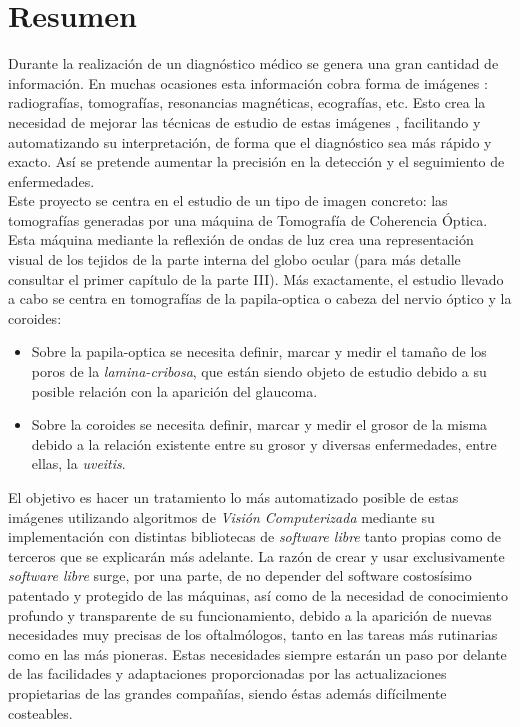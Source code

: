 \section*{Resumen}
Durante la realización de un diagnóstico médico se genera una gran
cantidad de información. En muchas ocasiones esta información cobra
forma de imágenes \emph{\citep*[1. The Analysis of Medical Images,
  2. Digital Image Acquisition]{toennies2012guide}}: radiografías,
tomografías, resonancias magnéticas, ecografías, etc. Esto crea la
necesidad de mejorar las técnicas de estudio de estas imágenes
\emph{\citep*[4. Image Enhancement]{toennies2012guide}}, facilitando y
automatizando su interpretación, de forma que el diagnóstico sea más
rápido y exacto. Así se pretende aumentar la precisión en la detección
y el seguimiento de enfermedades.\\
Este proyecto se centra en el estudio de un tipo de imagen concreto:
las tomografías generadas por una máquina de Tomografía de Coherencia
Óptica. Esta máquina mediante la reflexión de ondas de luz crea una
representación visual de los tejidos de la parte interna del globo
ocular (para más detalle consultar el primer capítulo de la parte
III). Más exactamente, el estudio llevado a cabo se centra en
tomografías de la \gls{papila-optica} o cabeza del nervio óptico y la
\gls{coroides}:
\begin{itemize}
\item Sobre la \gls{papila-optica} se necesita definir, marcar y medir
  el tamaño de los poros de la \emph{\gls{lamina-cribosa}}, que están
  siendo objeto de estudio debido a su posible relación con la
  aparición del \gls{glaucoma}.
\item Sobre la \gls{coroides} se necesita definir, marcar y medir el
  grosor de la misma debido a la relación existente entre su grosor y
  diversas enfermedades, entre ellas, la \emph{\gls{uveitis}}.
\end{itemize}
El objetivo es hacer un tratamiento lo más automatizado posible de
estas imágenes utilizando algoritmos de \emph{Visión Computerizada}
mediante su implementación con distintas bibliotecas de \emph{software
  libre} tanto propias como de terceros que se explicarán más
adelante. La razón de crear y usar exclusivamente \emph{software
  libre} surge, por una parte, de no depender del software costosísimo
patentado y protegido de las máquinas, así como de la necesidad de
conocimiento profundo y transparente de su funcionamiento, debido a la
aparición de nuevas necesidades muy precisas de los oftalmólogos,
tanto en las tareas más rutinarias como en las más pioneras. Estas
necesidades siempre estarán un paso por delante de las facilidades y
adaptaciones proporcionadas por las actualizaciones propietarias de
las grandes compañías, siendo éstas además difícilmente costeables.

